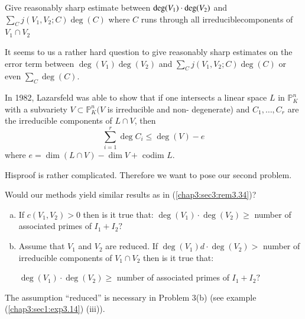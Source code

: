 \setcounter{numproblem}{32}
\begin{numproblem}[1]\label{chap3:sec3:prob3.33}
  Give reasonably sharp estimate between $\deg (V_1)\cdot\break \deg (V_2)$ and
  $\sum\limits_C j(V_1, V_2;C) \deg (C)$ where $C$ runs through all
  irreducible\break components of $V_1 \cap V_2$   
\end{numproblem}

\setcounter{remark}{33}
\begin{remark}\label{chap3:sec3:rem3.34}
  It seems  to us a rather hard question to give reasonably sharp
  estimates on the error term between $\deg (V_1) \deg (V_2)$
  and\break 
  $\sum \limits_C j(V_1, V_2;C) \deg (C)$ or even $\sum \limits _C
  \deg (C)$. 
\end{remark}

  In 1982, Lazarsfeld was able to show that if one intersects a linear
  space $L$ in $\mathbb{P}_K^n$ with a subvariety $V \subset
  \mathbb{P}_K^n (V$ is irreducible and non- degenerate) and $C_1,
  \ldots, C_r$ are the irreducible components of $L \cap V$, then 
  $$
  \sum_{i=1}^r \deg C_i \leq  \deg (V) - e
  $$
  where $e=\dim (L \cap V) - \dim V + $ codim $L$.
  
  His\pageoriginale proof is rather complicated. Therefore we want to
  pose our second problem. 
  
\setcounter{numproblem}{34}
\begin{numproblem}[2]\label{chap3:sec3:prob3.35}
  Would our methods yield similar results as in
  (\ref{chap3:sec3:rem3.34})?
\end{numproblem}

\begin{numproblem}[3]\label{chap3:sec3:prob3.36}
  \begin{enumerate}[(a)]
  \item If $c(V_1,V_2)>0 $ then is it true that: $\deg (V_1 )\cdot
    \deg (V_2) 
    \geq $ number of associated primes of $I_1 + I_2 ?$ 
  \item Assume that $V_1$ and $V_2$ are reduced. If $\deg (V_1) d
    \cdot \deg (V_2)> $ number of irreducible components of $V_1 \cap
    V_2 $ then is it true that: 
    
    $\deg (V_1)\cdot\deg (V_2) \geq $ number of associated primes of
    $I_1 + I_2 ?$ 
  \end{enumerate}
\end{numproblem}

\setcounter{remark}{36}
\begin{remark}\label{chap3:sec3:rem3.37}
  The assumption ``reduced'' is necessary in Problem 3(b) (see example
  (\ref{chap3:sec1:exp3.14}) (iii)). 
\end{remark}

